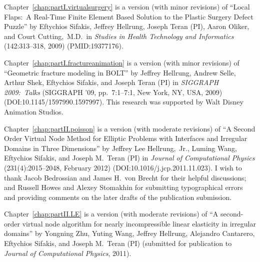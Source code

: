 {Chapter~\ref{chap:partI.virtualsurgery} is a version (with minor revisions) of ``Local Flaps:\ A Real-Time Finite Element Based Solution to the Plastic Surgery Defect Puzzle'' by Eftychios Sifakis, Jeffrey Hellrung, Joseph Teran (PI), Aaron Oliker, and Court Cutting,~M.D.\ in \textit{Studies in Health Technology and Informatics} (142:313--318, 2009) (PMID:19377176).

Chapter~\ref{chap:partI.fractureanimation} is a version (with minor revisions) of ``Geometric fracture modeling in BOLT'' by Jeffrey Hellrung, Andrew Selle, Arthur Shek, Eftychios Sifakis, and Joseph Teran (PI) in \textit{SIGGRAPH 2009:\ Talks} (SIGGRAPH '09, pp.\ 7:1--7:1, New York, NY, USA, 2009) \linebreak[4] (DOI:10.1145/1597990.1597997). This research was supported by Walt Disney Animation Studios.

Chapter~\ref{chap:partII.poisson} is a version (with moderate revisions) of ``A Second Order Virtual Node Method for Elliptic Problems with Interfaces and Irregular Domains in Three Dimensions'' by Jeffrey Lee Hellrung,~Jr., Luming Wang, Eftychios Sifakis, and Joseph M.\ Teran (PI) in \textit{Journal of Computational Physics} (231(4):2015--2048, February 2012) (DOI:10.1016/j.jcp.2011.11.023). I wish to thank Jacob Bedrossian and James H.\ von Brecht for their helpful discussions; and Russell Howes and Alexey Stomakhin for submitting typographical errors and providing comments on the later drafts of the publication submission.

Chapter~\ref{chap:partII.LE} is a version (with moderate revisions) of ``A second-order virtual node algorithm for nearly incompressible linear elasticity in irregular domains'' by Yongning Zhu, Yuting Wang, Jeffrey Hellrung, Alejandro Cantarero, Eftychios Sifakis, and Joseph M.\ Teran (PI) (submitted for publication to \textit{Journal of Computational Physics}, 2011).
}


